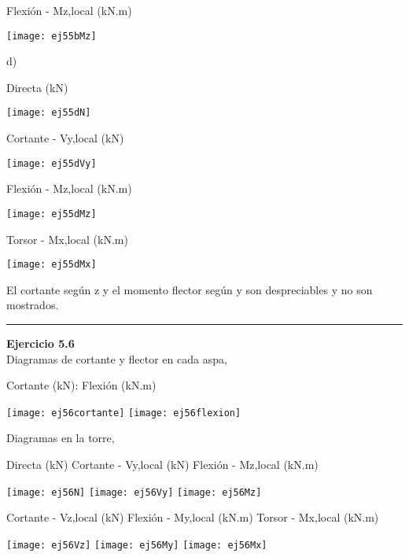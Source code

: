 Flexión - Mz,local (kN.m)

	\begin{center}
	\texttt{[image: ej55bMz]}
\end{center}

d)

Directa (kN)

	\begin{center}
	\texttt{[image: ej55dN]}
\end{center}


Cortante - Vy,local (kN)

\begin{center}
	\texttt{[image: ej55dVy]}
\end{center}

Flexión - Mz,local (kN.m)

\begin{center}
	\texttt{[image: ej55dMz]}
\end{center}


Torsor - Mx,local (kN.m)


\begin{center}
	\texttt{[image: ej55dMx]}
\end{center}

El cortante según z y el momento flector según y son despreciables y no son mostrados. 

\hrule
\vspace{5mm}
\textbf{Ejercicio 5.6}\\

Diagramas de cortante y flector en cada aspa,

Cortante (kN):  \qquad 
Flexión (kN.m)

\texttt{[image: ej56cortante]}
\texttt{[image: ej56flexion]}


Diagramas en la torre,

\noindent
Directa (kN)
\quad
Cortante - Vy,local (kN)
\quad
Flexión - Mz,local (kN.m)

\texttt{[image: ej56N]}
\texttt{[image: ej56Vy]}
\texttt{[image: ej56Mz]}


\noindent
Cortante - Vz,local (kN)
\quad
Flexión - My,local (kN.m)
\quad
Torsor - Mx,local (kN.m)

\texttt{[image: ej56Vz]}
\texttt{[image: ej56My]}
\texttt{[image: ej56Mx]}









